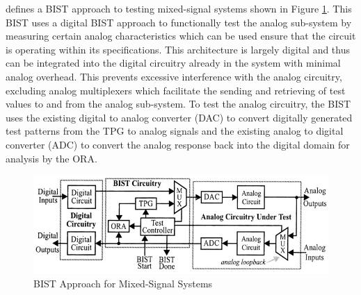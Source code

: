 \documentclass[12pt]{report}
\begin{document}
\cite{stroud} defines a BIST approach to testing mixed-signal systems shown in Figure \ref{fig:mixedbist1}.  This BIST uses a digital BIST approach to functionally test the analog sub-system by measuring certain analog characteristics which can be used ensure that the circuit is operating within its specifications.  This architecture is largely digital and thus can be integrated into the digital circuitry already in the system with minimal analog overhead.  This prevents excessive interference with the analog circuitry, excluding analog multiplexers which facilitate the sending and retrieving of test values to and from the analog sub-system\cite{stroud}.  To test the analog circuitry, the BIST uses the existing digital to analog converter (DAC) to convert digitally generated test patterns from the TPG to analog signals and the existing analog to digital converter (ADC) to convert the analog response back into the digital domain for analysis by the ORA\cite{stroud}.
\begin{figure}
	\begin{center}
		\includegraphics[scale=1]{images/mixed-bist-architecture}
	\end{center}
	\caption{BIST Approach for Mixed-Signal Systems\cite{stroud}}
	\label{fig:mixedbist1}
\end{figure}
\end{document}
